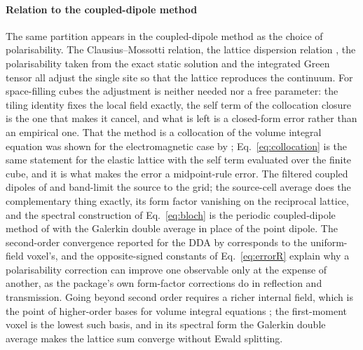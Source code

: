 \documentclass[preprint,review,12pt]{elsarticle}
\begin{document}
\paragraph{Relation to the coupled-dipole method} The same partition appears in the
coupled-dipole method as the choice of polarisability. The Clausius--Mossotti relation, the lattice
dispersion relation \citep{Draine1993}, the polarisability taken from the exact static solution
\citep{Rahmani2002} and the integrated Green tensor \citep{Chaumet2004} all adjust the single site
so that the lattice reproduces the continuum. For space-filling cubes the adjustment is neither
needed nor a free parameter: the tiling identity fixes the local field exactly, the self term of the
collocation closure is the one that makes it cancel, and what is left is a closed-form error rather
than an empirical one. That the method is a collocation of the volume integral equation was shown
for the electromagnetic case by \citet{Lakhtakia1992}; Eq.~\eqref{eq:collocation} is the same
statement for the elastic lattice with the self term evaluated over the finite cube, and it is what
makes the error a midpoint-rule error. The filtered coupled dipoles of \citet{Piller1998} and
\citet{Yurkin2010} band-limit the source to the grid; the source-cell average does the
complementary thing exactly, its form factor vanishing on the reciprocal lattice, and the spectral
construction of Eq.~\eqref{eq:bloch} is the periodic coupled-dipole method of \citet{Chaumet2003}
with the Galerkin double average in place of the point dipole. The second-order convergence
reported for the DDA by \citet{Yurkin2006} corresponds to the uniform-field voxel's, and the
opposite-signed constants of Eq.~\eqref{eq:errorR} explain why a polarisability correction can
improve one observable only at the expense of another, as the package's own form-factor corrections
do in reflection and transmission. Going beyond second order requires a richer internal field, which
is the point of higher-order bases for volume integral equations
\citep{Chobanyan2013,Georgakis2020}; the first-moment voxel is the
lowest such basis, and in its spectral form the Galerkin double average makes the lattice sum
converge without Ewald splitting.
\end{document}

